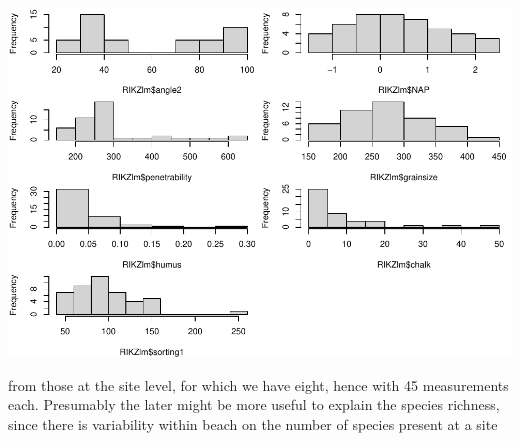 \documentclass[
]{book}
\newenvironment{Shaded}{\begin{snugshade}}{\end{snugshade}}
\newcommand{\AttributeTok}[1]{\textcolor[rgb]{0.13,0.29,0.53}{#1}}
\newcommand{\DecValTok}[1]{\textcolor[rgb]{0.00,0.00,0.81}{#1}}
\newcommand{\FloatTok}[1]{\textcolor[rgb]{0.00,0.00,0.81}{#1}}
\newcommand{\FunctionTok}[1]{\textcolor[rgb]{0.13,0.29,0.53}{\textbf{#1}}}
\newcommand{\NormalTok}[1]{#1}
\newcommand{\SpecialCharTok}[1]{\textcolor[rgb]{0.81,0.36,0.00}{\textbf{#1}}}
\newcommand{\StringTok}[1]{\textcolor[rgb]{0.31,0.60,0.02}{#1}}
\begin{document}
\includegraphics{ECOMODbook_files/figure-latex/unnamed-chunk-15-1.pdf}

from those at the site level, for which we have eight, hence with 45 measurements each. Presumably the later might be more useful to explain the species richness, since there is variability within beach on the number of species present at a site

\begin{Shaded}
\end{Shaded}
\end{document}
